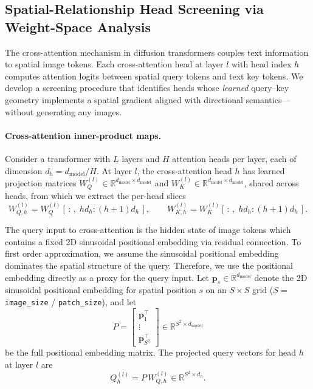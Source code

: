 \clearpage
\subsection{Spatial-Relationship Head Screening via Weight-Space Analysis}\label{method:head_screening}

The cross-attention mechanism in diffusion transformers couples text information to spatial image tokens. Each cross-attention head at layer $l$ with head index $h$ computes attention logits between spatial query tokens and text key tokens. We develop a screening procedure that identifies heads whose \emph{learned} query--key geometry implements a spatial gradient aligned with directional semantics---without generating any images.

\paragraph{Cross-attention inner-product maps.}
Consider a transformer with $L$ layers and $H$ attention heads per layer, each of dimension $d_h = d_{\mathrm{model}} / H$. At layer $l$, the cross-attention head $h$ has learned projection matrices $W_Q^{(l)} \in \mathbb{R}^{d_{\mathrm{model}} \times d_{\mathrm{model}}}$ and $W_K^{(l)} \in \mathbb{R}^{d_{\mathrm{model}} \times d_{\mathrm{model}}}$, shared across heads, from which we extract the per-head slices
\begin{equation}
    W_{Q,h}^{(l)} = W_Q^{(l)}[\,:\,,\; h d_h : (h{+}1)d_h\,], \qquad
    W_{K,h}^{(l)} = W_K^{(l)}[\,:\,,\; h d_h : (h{+}1)d_h\,].
\end{equation}

The query input to cross-attention is the hidden state of image tokens which contains a fixed 2D sinusoidal positional embedding via residual connection. To first order approximation, we assume the sinusoidal positional embedding dominates the spatial structure of the query. Therefore, we use the positional embedding directly as a proxy for the query input. Let $\mathbf{p}_s \in \mathbb{R}^{d_{\mathrm{model}}}$ denote the 2D sinusoidal positional embedding for spatial position $s$ on an $S \times S$ grid ($S = $ \texttt{image\_size} / \texttt{patch\_size}), and let
\begin{equation}
    P = \begin{bmatrix} \mathbf{p}_1^\top \\ \vdots \\ \mathbf{p}_{S^2}^\top \end{bmatrix} \in \mathbb{R}^{S^2 \times d_{\mathrm{model}}}
\end{equation}
be the full positional embedding matrix. The projected query vectors for head $h$ at layer $l$ are
\begin{equation}
    Q_h^{(l)} = P \, W_{Q,h}^{(l)} \in \mathbb{R}^{S^2 \times d_h}.
\end{equation}

